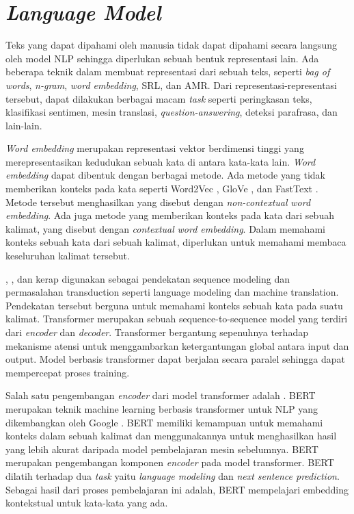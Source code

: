 \section{\textit{Language Model}}

\newcommand{\wordem}{\textit{word embedding}}
\newcommand{\Wordem}{\textit{Word embedding}}
\newcommand{\mwordem}{\textit{multilingual word embedding}}
\newcommand{\Mwordem}{\textit{Multilingual word embedding}}
\newcommand{\multil}{\textit{multilingual}}

Teks yang dapat dipahami oleh manusia tidak dapat dipahami secara langsung oleh model \gls{NLP} sehingga diperlukan sebuah bentuk representasi lain.
Ada beberapa teknik dalam membuat representasi dari sebuah teks, seperti \textit{bag of words}, \textit{n-gram}, \wordem{}, \gls{SRL}, dan \gls{AMR}.
Dari representasi-representasi tersebut, dapat dilakukan berbagai macam \textit{task} seperti peringkasan teks, klasifikasi sentimen, mesin translasi, \textit{question-answering}, deteksi parafrasa, dan lain-lain.

\Wordem{} merupakan representasi vektor berdimensi tinggi yang merepresentasikan kedudukan sebuah kata di antara kata-kata lain.
\Wordem{} dapat dibentuk dengan berbagai metode.
Ada metode yang tidak memberikan konteks pada kata seperti Word2Vec , GloVe , dan FastText .
Metode tersebut menghasilkan yang disebut dengan \textit{non-contextual} \wordem{}.
Ada juga metode yang memberikan konteks pada kata dari sebuah kalimat, yang disebut dengan \textit{contextual} \wordem{}.
Dalam memahami konteks sebuah kata dari sebuah kalimat, diperlukan untuk memahami membaca keseluruhan kalimat tersebut.

, , dan  kerap digunakan sebagai pendekatan sequence modeling dan permasalahan transduction seperti language modeling dan machine translation.
Pendekatan tersebut berguna untuk memahami konteks sebuah kata pada suatu kalimat.
Transformer merupakan sebuah sequence-to-sequence model yang terdiri dari \textit{encoder} dan \textit{decoder}.
Transformer bergantung sepenuhnya terhadap mekanisme atensi untuk menggambarkan ketergantungan global antara input dan output.
Model berbasis transformer dapat berjalan secara paralel sehingga dapat mempercepat proses training.

Salah satu pengembangan \textit{encoder} dari model transformer adalah .
\gls{BERT} merupakan teknik machine learning berbasis transformer untuk \gls{NLP} yang dikembangkan oleh Google .
\gls{BERT} memiliki kemampuan untuk memahami konteks dalam sebuah kalimat dan menggunakannya untuk menghasilkan hasil yang lebih akurat daripada model pembelajaran mesin sebelumnya.
\gls{BERT} merupakan pengembangan komponen \textit{encoder} pada model transformer.
\gls{BERT} dilatih terhadap dua \textit{task} yaitu \textit{language modeling} dan \textit{next sentence prediction}.
Sebagai hasil dari proses pembelajaran ini adalah, \gls{BERT} mempelajari embedding kontekstual untuk kata-kata yang ada.

